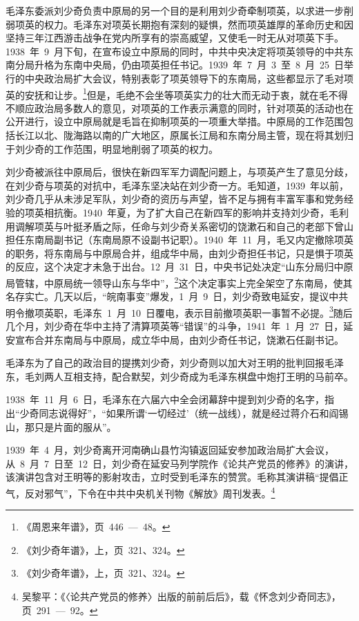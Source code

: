 毛泽东委派刘少奇负责中原局的另一个目的是利用刘少奇牵制项英，以求进一步削弱项英的权力。毛泽东对项英长期抱有深刻的疑惧，然而项英雄厚的革命历史和因坚持三年江西游击战争在党内所享有的崇高威望，又使毛一时无从对项英下手。1938~年~9~月下旬，在宣布设立中原局的同时，中共中央决定将项英领导的中共东南分局升格为东南中央局，仍由项英担任书记。1939~年~7~月~3~至~8~月~25~日举行的中央政治局扩大会议，特别表彰了项英领导下的东南局，这些都显示了毛对项英的安抚和让步。\footnote{《周恩来年谱》，页~446~—~48。}但是，毛绝不会坐等项英实力的壮大而无动于衷，就在毛不得不顺应政治局多数人的意见，对项英的工作表示满意的同时，针对项英的活动也在公开进行，设立中原局就是毛旨在抑制项英的一项重大举措。中原局的工作范围包括长江以北、陇海路以南的广大地区，原属长江局和东南分局主管，现在将其划归于刘少奇的工作范围，明显地削弱了项英的权力。

刘少奇被派往中原局后，很快在新四军军力调配问题上，与项英产生了意见分歧，在刘少奇与项英的对抗中，毛泽东坚决站在刘少奇一方。毛知道，1939~年以前，刘少奇几乎从未涉足军队，刘少奇的资历与声望，皆不足与拥有丰富军事和党务经验的项英相抗衡。1940~年夏，为了扩大自己在新四军的影响并支持刘少奇，毛利用调解项英与叶挺矛盾之际，任命与刘少奇关系密切的饶漱石和自己的老部下曾山担任东南局副书记（东南局原不设副书记职）。1940~年~11~月，毛又内定撤除项英的职务，将东南局与中原局合并，组成华中局，由刘少奇担任书记，只是惧于项英的反应，这个决定才未急于出台。12~月~31~日，中央书记处决定“山东分局归中原局管辖，中原局统一领导山东与华中”，\footnote{《刘少奇年谱》，上，页~321、324。}这个决定事实上完全架空了东南局，使其名存实亡。几天以后，“皖南事变”爆发，1~月~9~日，刘少奇致电延安，提议中共明令撤项英职，毛泽东~1~月~10~日覆电，表示目前撤项英职一事暂不必提。\footnote{《刘少奇年谱》，上，页~321、324。}随后几个月，刘少奇在华中主持了清算项英等“错误”的斗争，1941~年~1~月~27~日，延安宣布合并东南局与中原局，成立华中局，由刘少奇任书记，饶漱石任副书记。

毛泽东为了自己的政治目的提携刘少奇，刘少奇则以加大对王明的批判回报毛泽东，毛刘两人互相支持，配合默契，刘少奇成为毛泽东棋盘中炮打王明的马前卒。

1938~年~11~月~6~日，毛泽东在六届六中全会闭幕辞中提到刘少奇的名字，指出“少奇同志说得好”，“如果所谓‘一切经过’（统一战线），就是经过蒋介石和阎锡山，那只是片面的服从”。

1939~年~4~月，刘少奇离开河南确山县竹沟镇返回延安参加政治局扩大会议，从~8~月~7~日至~12~日，刘少奇在延安马列学院作《论共产党员的修养》的演讲，该演讲包含对王明等的影射攻击，立时受到毛泽东的赞赏。毛称其演讲稿“提倡正气，反对邪气”，下令在中共中央机关刊物《解放》周刊发表。\footnote{吴黎平：《〈论共产党员的修养〉出版的前前后后》，载《怀念刘少奇同志》，页~291~—~92。}

